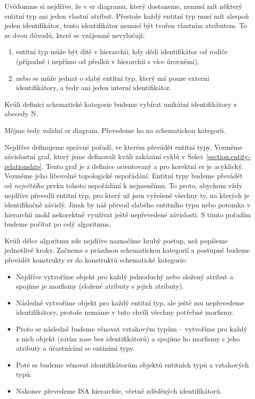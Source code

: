 Uvědomme si nejdříve, že v \acrshort{er} diagramu, který dostaneme, nemusí mít některý entitní typ ani jeden vlastní atribut.
Přestože každý entitní typ musí mít alespoň jeden identifikátor, tento identifikátor nemusí být tvořen vlastním atributem.
To ze dvou důvodů, které se vzájemně nevylučují:
\begin{enumerate}
  \item entitní typ může být dítě v hierarchii, kdy dědí identifikátor od rodiče (případně i nepřímo od předků v hierarchii s více úrovněmi),
  \item nebo se může jednat o slabý entitní typ, který má pouze externí identifikátory, a tedy ani jeden interní identifikátor.
\end{enumerate}

Kvůli definici schematické kategorie budeme vybírat unikátní identifikátory z abecedy $\mathbb{N}$.

Mějme tedy validní \acrshort{er} diagram.
Převedeme ho na schematickou kategorii.

Nejdříve definujeme správné pořadí, ve kterém převádět entitní typy.
Vezměme závislostní graf, který jsme definovali kvůli zakázání cyklů v Sekci~\ref{section:entity-relationship}.
Tento graf je z definice orientovaný a pro korektní \acrshort{er} je acyklický.
Vezměme jeho libovolné topologické uspořádání.
Entitní typy budeme převádět od \emph{největšího} prvku tohoto uspořádání k nejmenšímu.
To proto, abychom vždy nejdříve převedli entitní typ, pro který už jsou vyřešené všechny ty, na kterých je identifikačně závislý.
Jinak by náš převod slabého entitního typu nebo potomka v hierarchii mohl nekorektně využívat ještě nepřevedené závislosti.
S tímto pořadím budeme počítat po celý algoritmus.

Kvůli délce algoritmu zde nejdříve naznačíme hrubý postup, než popíšeme jednotlivé kroky.
Začneme s prázdnou schematickou kategorií a postupně budeme převádět konstrukty \acrshort{er} do konstruktů schematické kategorie:
\begin{itemize}
  \item Nejdříve vytvoříme objekt pro každý jednoduchý nebo složený atribut a spojíme je morfismy (složené atributy s jejich atributy).
  \item Následně vytvoříme objekt pro každý entitní typ, ale ještě mu nepřevedeme identifikátory, protože nemáme v tuto chvíli všechny potřebné morfismy.
  \item Proto se následně budeme věnovat vztahovým typům -- vytvoříme pro každý z nich objekt (zatím zase bez identifikátorů) a spojíme ho morfismy s jeho atributy a účastnícími se entiními typy.
  \item Poté se budeme věnovat identifikátorům objektů entitních typů a vztahových typů.
  \item Nakonec převedeme ISA hierarchie, včetně zděděných identifikátorů.
\end{itemize}

